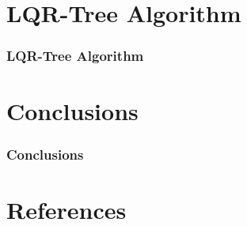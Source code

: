 \documentclass{beamer}
\begin{document}

\section{LQR-Tree Algorithm}
\begin{frame}
\frametitle{LQR-Tree Algorithm}

\end{frame}

\section{Conclusions}
\begin{frame}
\frametitle{Conclusions}


\end{frame}


\section{References}
\end{document}
